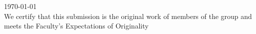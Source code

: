 \documentclass[12pt,a4paper]{article}
\begin{document}
\begin{titlepage}
		
		
		{\large \today}\\[4cm] %
		
	
		We certify that this submission is the original work of members of the group and meets the Faculty's Expectations of Originality
		
		
		\vfill %
		
	\end{titlepage}
	
	
\end{document}
